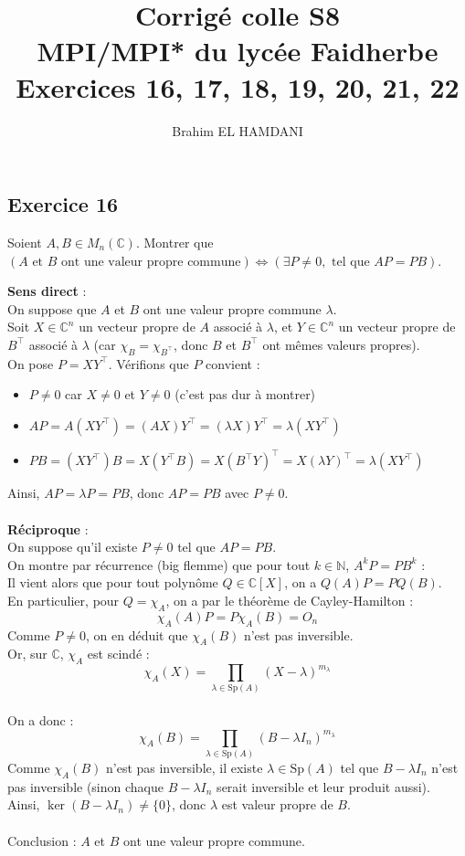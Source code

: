 \documentclass[a4paper,12pt]{article}
\title{Corrigé colle S8 \\
	MPI/MPI* du lycée Faidherbe \\
	\large Exercices 16, 17, 18, 19, 20, 21, 22}
\author{Brahim EL HAMDANI}
\begin{document}
	\maketitle
	
	\subsection*{Exercice 16}
    Soient $A, B \in M_n(\mathbb{C})$.
	Montrer que $(A \text{ et } B \text{ ont une valeur propre commune}) \iff (\exists P \neq 0, \text{ tel que } AP = PB)$.
	
	\begin{correctionbox}
		\textbf{Sens direct} : \\
		On suppose que $A$ et $B$ ont une valeur propre commune $\lambda$. \\
		Soit $X \in \mathbb{C}^n$ un vecteur propre de $A$ associé à $\lambda$, et $Y \in \mathbb{C}^n$ un vecteur propre de $B^\top$ associé à $\lambda$ (car  $\chi_B = \chi_{B^\top}$, donc $B$ et $B^\top$ ont mêmes valeurs propres). \\
		On pose $P = X Y^\top$. Vérifions que $P$ convient :
		\begin{itemize}
			\item $P \neq 0$ car $X \neq 0$ et $Y \neq 0$ (c'est pas dur à montrer)
			\item $AP = A(X Y^\top) = (AX) Y^\top = (\lambda X) Y^\top = \lambda (X Y^\top)$
			\item $PB = (X Y^\top) B = X (Y^\top B) = X (B^\top Y)^\top = X (\lambda Y)^\top = \lambda (X Y^\top)$
		\end{itemize}
		Ainsi, $AP = \lambda P = PB$, donc $AP = PB$ avec $P \neq 0$.	
		\\\\
		\textbf{Réciproque} : \\
		On suppose qu'il existe $P \neq 0$ tel que $AP = PB$. \\ On montre par récurrence (big flemme) que pour tout $k \in \mathbb{N}$, $A^k P = P B^k$ :\\ Il vient alors que pour tout polynôme $Q \in \mathbb{C}[X]$, on a $Q(A)P = P Q(B)$.\\En particulier, pour $Q = \chi_A$, on a par le théorème de Cayley-Hamilton :
		$$\chi_A(A) P = P \chi_A(B) = O_n$$
		Comme $P \neq 0$, on en déduit que $\chi_A(B)$ n'est pas inversible. \\
		
		Or, sur $\mathbb{C}$, $\chi_A$ est scindé :
		$$\chi_A(X) = \prod_{\lambda \in \mathrm{Sp}(A)} (X - \lambda)^{m_\lambda}$$\\
		
		On a donc :
		$$\chi_A(B) = \prod_{\lambda \in \mathrm{Sp}(A)} (B - \lambda I_n)^{m_\lambda}$$
		Comme $\chi_A(B)$ n'est pas inversible, il existe $\lambda \in \mathrm{Sp}(A)$ tel que $B - \lambda I_n$ n'est pas inversible (sinon chaque $B - \lambda I_n$ serait inversible et leur produit aussi). \\ Ainsi, $\ker(B - \lambda I_n) \neq \{0\}$, donc $\lambda$ est valeur propre de $B$. \\\\Conclusion : $A$ et $B$ ont une valeur propre commune.
	\end{correctionbox}
\end{document}

